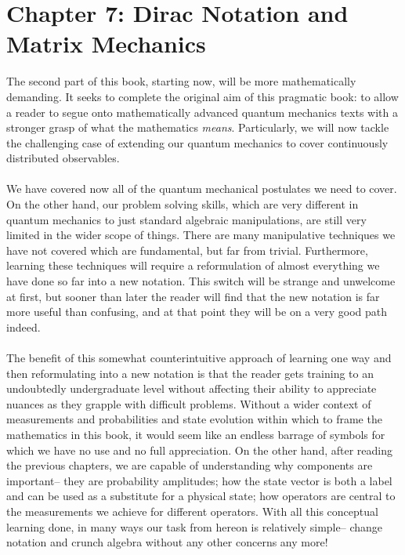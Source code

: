 \chapter{Chapter 7: Dirac Notation and Matrix Mechanics}
The second part of this book, starting now, will be more mathematically demanding. It seeks to complete the original aim of this pragmatic book: to allow a reader to segue onto mathematically advanced quantum mechanics texts with a stronger grasp of what the mathematics \textit{means}. Particularly, we will now tackle the challenging case of extending our quantum mechanics to cover continuously distributed observables.
\\\\
We have covered now all of the quantum mechanical postulates we need to cover. On the other hand, our problem solving skills, which are very different in quantum mechanics to just standard algebraic manipulations, are still very limited in the wider scope of things. There are many manipulative techniques we have not covered which are fundamental, but far from trivial. Furthermore, learning these techniques will require a reformulation of almost everything we have done so far into a new notation. This switch will be strange and unwelcome at first, but sooner than later the reader will find that the new notation is far more useful than confusing, and at that point they will be on a very good path indeed.
\\\\
The benefit of this somewhat counterintuitive approach of learning one way and then reformulating into a new notation is that the reader gets training to an undoubtedly undergraduate level without affecting their ability to appreciate nuances as they grapple with difficult problems. Without a wider context of measurements and probabilities and state evolution within which to frame the mathematics in this book, it would seem like an endless barrage of symbols for which we have no use and no full appreciation. On the other hand, after reading the previous chapters, we are capable of understanding why components are important-- they are probability amplitudes; how the state vector is both a label and can be used as a substitute for a physical state; how operators are central to the measurements we achieve for different operators. With all this conceptual learning done, in many ways our task from hereon is relatively simple-- change notation and crunch algebra without any other concerns any more! 
\\\\
